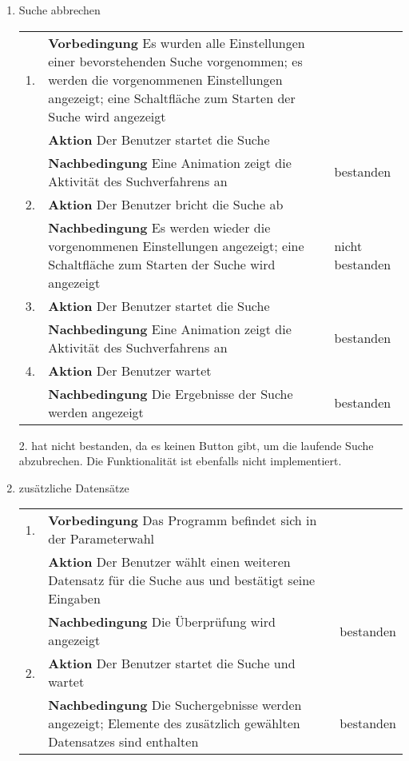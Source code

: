 \begin{enumerate} [label=\bfseries /TSW \arabic*0/, leftmargin=*]
	\item Suche abbrechen \newline \newline
	\begin{tabular}{@{}rp{4in}|l}
	1. & \textbf{Vorbedingung} Es wurden alle Einstellungen einer bevorstehenden Suche vorgenommen; es werden die vorgenommenen Einstellungen angezeigt; eine Schaltfläche zum Starten der Suche wird angezeigt & \\
	   & \textbf{Aktion} Der Benutzer startet die Suche & \\
	   & \textbf{Nachbedingung} Eine Animation zeigt die Aktivität des Suchverfahrens an & bestanden \\
	\hline
	2. & \textbf{Aktion} Der Benutzer bricht die Suche ab & \\
	   & \textbf{Nachbedingung} Es werden wieder die vorgenommenen Einstellungen angezeigt; eine Schaltfläche zum Starten der Suche wird angezeigt & nicht bestanden \\
	\hline
	3. & \textbf{Aktion} Der Benutzer startet die Suche & \\
	   & \textbf{Nachbedingung} Eine Animation zeigt die Aktivität des Suchverfahrens an & bestanden \\
	\hline
	4. & \textbf{Aktion} Der Benutzer wartet & \\
	   & \textbf{Nachbedingung} Die Ergebnisse der Suche werden angezeigt & bestanden \\
	\end{tabular}
	\par
2. hat nicht bestanden, da es keinen Button gibt, um die laufende Suche abzubrechen. Die Funktionalität ist ebenfalls nicht implementiert.
	\newline

	\item zusätzliche Datensätze \newline \newline
	\begin{tabular}{@{}rp{4in}|l}
	1. & \textbf{Vorbedingung} Das Programm befindet sich in der Parameterwahl & \\
	   & \textbf{Aktion} Der Benutzer wählt einen weiteren Datensatz für die Suche aus und bestätigt seine Eingaben & \\
	   & \textbf{Nachbedingung} Die Überprüfung wird angezeigt & bestanden \\
	\hline	
	2. & \textbf{Aktion} Der Benutzer startet die Suche und wartet & \\
	   & \textbf{Nachbedingung} Die Suchergebnisse werden angezeigt; Elemente des zusätzlich gewählten Datensatzes sind enthalten & bestanden \\
	\end{tabular}
	\newline


\end{enumerate}
